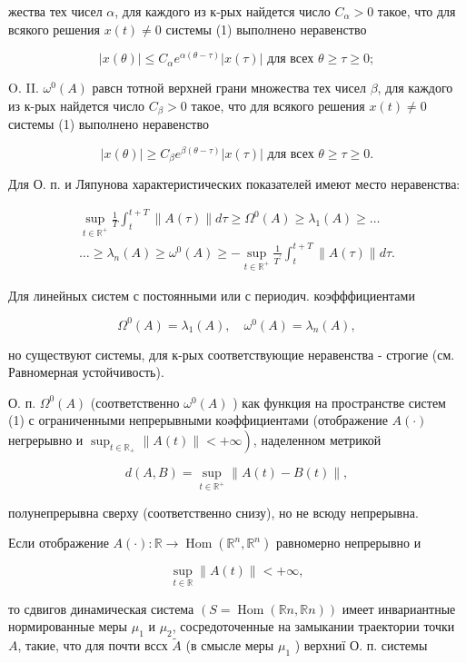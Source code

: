 \documentclass[10pt]{article}
\begin{document}
жества тех чисел $\alpha$, для каждого из к-рых найдется число $C_{\alpha}>0$ такое, что для всякого решения $x(t) \neq 0$ системы (1) выполнено неравенство

\[
|x(\theta)| \leqslant C_{\alpha} e^{\alpha(\theta-\tau)}|x(\tau)| \text { для всех } \theta \geqslant \tau \geqslant 0 ;
\]

O. II. $\omega^{0}(A)$ равсн тотной верхней грани множества тех чисел $\beta$, для каждого из к-рых найдется число $C_{\beta}>0$ такое, что для всякого решения $x(t) \neq 0$ системы (1) выполнено неравенство

\[
|x(\theta)| \geqslant C_{\beta} e^{\beta(\theta-\tau)}|x(\tau)| \text { для всех } \theta \geqslant \tau \geqslant 0 .
\]

Для О. п. и Ляпунова характеристических показателей имеют место неравенства:

\[
\begin{gathered}
\sup _{t \in \mathbb{R}^{+}} \frac{1}{T} \int_{t}^{t+T}\|A(\tau)\| d \tau \geqslant \Omega^{0}(A) \geqslant \lambda_{1}(A) \geqslant \ldots \\
\ldots \geqslant \lambda_{n}(A) \geqslant \omega^{0}(A) \geqslant-\sup _{t \in \mathbb{R}^{+}} \frac{1}{T^{\prime}} \int_{t}^{t+T}\|A(\tau)\| d \tau .
\end{gathered}
\]

Для линейных систем с постоянными или с периодич. коэфффициентами

\[
\Omega^{0}(A)=\lambda_{1}(A), \quad \omega^{0}(A)=\lambda_{n}(A),
\]

но существуют системы, для к-рых соответствующие неравенства - строгие (см. Равномерная устойчивость).

О. п. $\Omega^{0}(A)$ (соответственно $\omega^{0}(A)$ ) как функция на пространстве систем (1) с ограниченными непрерывными коәффициентами (отображение $A(\cdot)$ негрерывно и $\left.\sup _{t \in \mathbb{R}_{+}}\|A(t)\|<+\infty\right)$, наделенном метрикой

\[
d(A, B)=\sup _{t \in \mathbb{R}^{+}}\|A(t)-B(t)\|,
\]

полунепрерывна сверху (соответственно снизу), но не всюду непрерывна.

Если отображение $A(\cdot): \mathbb{R} \rightarrow \operatorname{Hom}\left(\mathbb{R}^{n}, \mathbb{R}^{n}\right)$ равномерно непрерывно и

\[
\sup _{t \in \mathbb{R}}\|A(t)\|<+\infty,
\]

то сдвигов динамическая система $(S=\operatorname{Hom}(\mathbb{R} n, \mathbb{R} n))$ имеет инвариантные нормированные меры $\mu_{1}$ и $\mu_{2}$, сосредоточенные на замыкании траектории точки $A$, такие, что для почти вссх $\tilde{A}$ (в смысле меры $\mu_{1}$ ) верхниї О. п. системы
\end{document}
